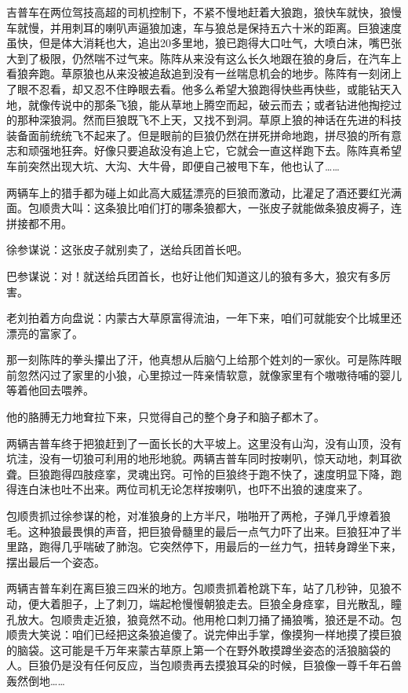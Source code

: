 \par 吉普车在两位驾技高超的司机控制下，不紧不慢地赶着大狼跑，狼快车就快，狼慢车就慢，并用刺耳的喇叭声逼狼加速，车与狼总是保持五六十米的距离。巨狼速度虽快，但是体大消耗也大，追出20多里地，狼已跑得大口吐气，大喷白沫，嘴巴张大到了极限，仍然喘不过气来。陈阵从来没有这么长久地跟在狼的身后，在汽车上看狼奔跑。草原狼也从来没被追敌追到没有一丝喘息机会的地步。陈阵有一刻闭上了眼不忍看，却又忍不住睁眼去看。他多么希望大狼跑得快些再快些，或能钻天入地，就像传说中的那条飞狼，能从草地上腾空而起，破云而去；或者钻进他掏挖过的那种深狼洞。然而巨狼既飞不上天，又找不到洞。草原上狼的神话在先进的科技装备面前统统飞不起来了。但是眼前的巨狼仍然在拼死拼命地跑，拼尽狼的所有意志和顽强地狂奔。好像只要追敌没有追上它，它就会一直这样跑下去。陈阵真希望车前突然出现大坑、大沟、大牛骨，即便自己被甩下车，他也认了……
\par 两辆车上的猎手都为碰上如此高大威猛漂亮的巨狼而激动，比灌足了酒还要红光满面。包顺贵大叫：这条狼比咱们打的哪条狼都大，一张皮子就能做条狼皮褥子，连拼接都不用。
\par 徐参谋说：这张皮子就别卖了，送给兵团首长吧。
\par 巴参谋说：对！就送给兵团首长，也好让他们知道这儿的狼有多大，狼灾有多厉害。
\par 老刘拍着方向盘说：内蒙古大草原富得流油，一年下来，咱们可就能安个比城里还漂亮的富家了。
\par 那一刻陈阵的拳头攥出了汗，他真想从后脑勺上给那个姓刘的一家伙。可是陈阵眼前忽然闪过了家里的小狼，心里掠过一阵亲情软意，就像家里有个嗷嗷待哺的婴儿等着他回去喂养。
\par 他的胳膊无力地耷拉下来，只觉得自己的整个身子和脑子都木了。
\par 两辆吉普车终于把狼赶到了一面长长的大平坡上。这里没有山沟，没有山顶，没有坑洼，没有一切狼可利用的地形地貌。两辆吉普车同时按喇叭，惊天动地，刺耳欲聋。巨狼跑得四肢痉挛，灵魂出窍。可怜的巨狼终于跑不快了，速度明显下降，跑得连白沫也吐不出来。两位司机无论怎样按喇叭，也吓不出狼的速度来了。
\par 包顺贵抓过徐参谋的枪，对准狼身的上方半尺，啪啪开了两枪，子弹几乎燎着狼毛。这种狼最畏惧的声音，把巨狼骨髓里的最后一点气力吓了出来。巨狼狂冲了半里路，跑得几乎喘破了肺泡。它突然停下，用最后的一丝力气，扭转身蹲坐下来，摆出最后一个姿态。
\par 两辆吉普车刹在离巨狼三四米的地方。包顺贵抓着枪跳下车，站了几秒钟，见狼不动，便大着胆子，上了刺刀，端起枪慢慢朝狼走去。巨狼全身痉挛，目光散乱，瞳孔放大。包顺贵走近狼，狼竟然不动。他用枪口刺刀捅了捅狼嘴，狼还是不动。包顺贵大笑说：咱们已经把这条狼追傻了。说完伸出手掌，像摸狗一样地摸了摸巨狼的脑袋。这可能是千万年来蒙古草原上第一个在野外敢摸蹲坐姿态的活狼脑袋的人。巨狼仍是没有任何反应，当包顺贵再去摸狼耳朵的时候，巨狼像一尊千年石兽轰然倒地……
